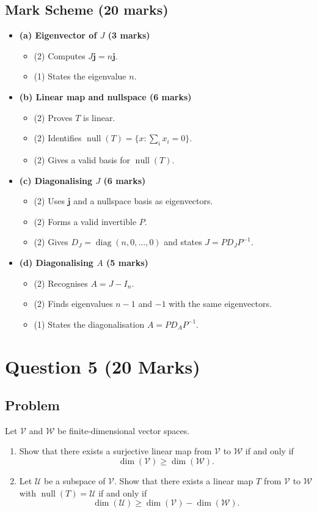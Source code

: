 \documentclass[12pt]{article}
\newcommand{\V}{\mathcal{V}}
\newcommand{\W}{\mathcal{W}}
\newcommand{\U}{\mathcal{U}}
\newcommand{\Null}{\operatorname{null}}
\newcommand{\diag}{\operatorname{diag}}
\begin{document}
\subsection{Mark Scheme (20 marks)}
\begin{itemize}[leftmargin=1.6em]
  \item \textbf{(a) Eigenvector of $J$ (3 marks)}
  \begin{itemize}[leftmargin=1.6em]
    \item (2) Computes $J\mathbf j=n\mathbf j$.
    \item (1) States the eigenvalue $n$.
  \end{itemize}
  \item \textbf{(b) Linear map and nullspace (6 marks)}
  \begin{itemize}[leftmargin=1.6em]
    \item (2) Proves $T$ is linear.
    \item (2) Identifies $\Null(T)=\{x:\sum_i x_i=0\}$.
    \item (2) Gives a valid basis for $\Null(T)$.
  \end{itemize}
  \item \textbf{(c) Diagonalising $J$ (6 marks)}
  \begin{itemize}[leftmargin=1.6em]
    \item (2) Uses $\mathbf j$ and a nullspace basis as eigenvectors.
    \item (2) Forms a valid invertible $P$.
    \item (2) Gives $D_J=\diag(n,0,\ldots,0)$ and states $J=PD_JP^{-1}$.
  \end{itemize}
  \item \textbf{(d) Diagonalising $A$ (5 marks)}
  \begin{itemize}[leftmargin=1.6em]
    \item (2) Recognises $A=J-I_n$.
    \item (2) Finds eigenvalues $n-1$ and $-1$ with the same eigenvectors.
    \item (1) States the diagonalisation $A=PD_AP^{-1}$.
  \end{itemize}
\end{itemize}

\newpage
\section{Question 5 \hfill (20 Marks)}

\subsection{Problem}
Let $\V$ and $\W$ be finite-dimensional vector spaces.
\begin{enumerate}[label=(\alph*)]
  \item Show that there exists a surjective linear map from $\V$ to $\W$ if and only if
  \[
  \dim(\V)\ge\dim(\W).
  \]
  \item Let $\U$ be a subspace of $\V$. Show that there exists a linear map $T$ from $\V$ to $\W$ with $\Null(T)=\U$ if and only if
  \[
  \dim(\U)\ge\dim(\V)-\dim(\W).
  \]
\end{enumerate}
\end{document}
